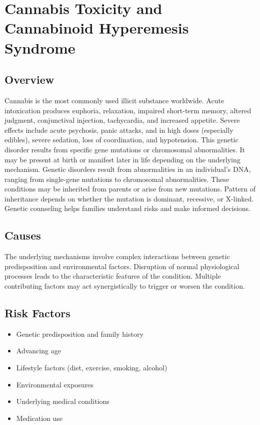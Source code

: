 \chapter{Cannabis Toxicity and Cannabinoid Hyperemesis Syndrome}
\label{sec:Cannabis Toxicity}

\section{Overview}
Cannabis is the most commonly used illicit substance worldwide. Acute intoxication produces euphoria, relaxation, impaired short-term memory, altered judgment, conjunctival injection, tachycardia, and increased appetite. Severe effects include acute psychosis, panic attacks, and in high doses (especially edibles), severe sedation, loss of coordination, and hypotension. This genetic disorder results from specific gene mutations or chromosomal abnormalities. It may be present at birth or manifest later in life depending on the underlying mechanism. Genetic disorders result from abnormalities in an individual's DNA, ranging from single-gene mutations to chromosomal abnormalities. These conditions may be inherited from parents or arise from new mutations. Pattern of inheritance depends on whether the mutation is dominant, recessive, or X-linked. Genetic counseling helps families understand risks and make informed decisions.
\section{Causes}
The underlying mechanisms involve complex interactions between genetic predisposition and environmental factors. Disruption of normal physiological processes leads to the characteristic features of the condition. Multiple contributing factors may act synergistically to trigger or worsen the condition.
\section{Risk Factors}


\begin{itemize}[noitemsep]
  \item Genetic predisposition and family history
  \item Advancing age
  \item Lifestyle factors (diet, exercise, smoking, alcohol)
  \item Environmental exposures
  \item Underlying medical conditions
  \item Medication use
\end{itemize}
